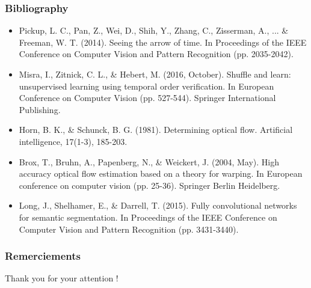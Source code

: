 \documentclass[french]{beamer}
\begin{document}
	\begin{frame}
		\frametitle{Bibliography}
		\scriptsize{
		\begin{itemize}
			
			\item Pickup, L. C., Pan, Z., Wei, D., Shih, Y., Zhang, C., Zisserman, A., ... \& Freeman, W. T. (2014). Seeing the arrow of time. In Proceedings of the IEEE Conference on Computer Vision and Pattern Recognition (pp. 2035-2042).
			
			\item Misra, I., Zitnick, C. L., \& Hebert, M. (2016, October). Shuffle and learn: unsupervised learning using temporal order verification. In European Conference on Computer Vision (pp. 527-544). Springer International Publishing.
			
			\item Horn, B. K., \& Schunck, B. G. (1981). Determining optical flow. Artificial intelligence, 17(1-3), 185-203.
			
			\item Brox, T., Bruhn, A., Papenberg, N., \& Weickert, J. (2004, May). High accuracy optical flow estimation based on a theory for warping. In European conference on computer vision (pp. 25-36). Springer Berlin Heidelberg.
			
			\item Long, J., Shelhamer, E., \& Darrell, T. (2015). Fully convolutional networks for semantic segmentation. In Proceedings of the IEEE Conference on Computer Vision and Pattern Recognition (pp. 3431-3440).
			
		\end{itemize}
	}
	\end{frame}
	
	\begin{frame}
	\frametitle{Remerciements}
	
	Thank you for your attention !
	
	\end{frame}
\end{document}
